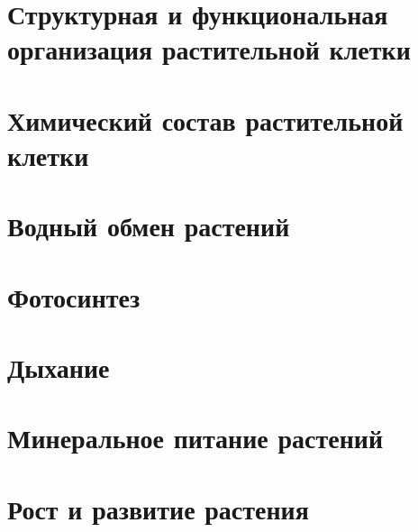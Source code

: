 \documentclass[12pt]{report}              %
\begin{document}
	

	\section{Структурная и функциональная организация растительной клетки}
	
	
	
	\section{Химический состав растительной клетки}
	
	

	\section{Водный обмен растений}
	
	
	
	\section{Фотосинтез}
	
	
	
	\section{Дыхание}
	
	
	
	\section{Минеральное питание растений}
	
	
	
	
	\section{Рост и развитие растения}
	
	
	
	
\end{document}
